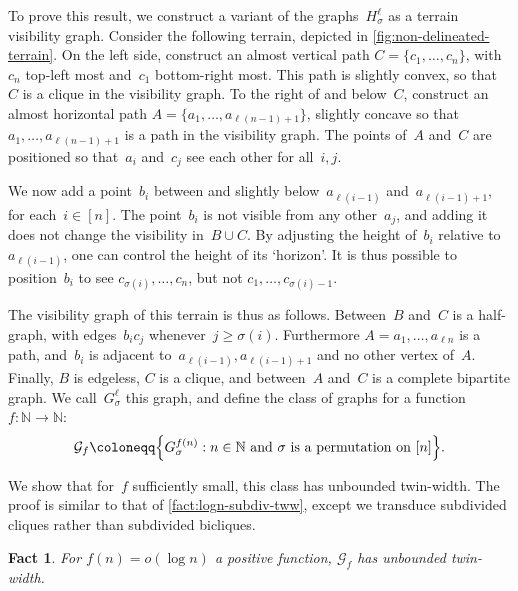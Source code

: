 \documentclass[a4paper,UKenglish,cleveref,thm-restate]{lipics-v2021}
\newtheorem{fact}[theorem]{Fact}
\theoremstyle{remark}
\newcommand{\Gc}{\mathcal{G}}
\newcommand{\N}{\mathbb{N}}
\begin{document}
To prove this result, we construct a variant of the graphs~$H_\sigma^\ell$ as a terrain visibility graph.
Consider the following terrain, depicted in \cref{fig:non-delineated-terrain}.
On the left side, construct an almost vertical path $C = \{c_1,\dots,c_n\}$, with~$c_n$ top-left most and~$c_1$ bottom-right most.
This path is slightly convex, so that~$C$ is a clique in the visibility graph.
To the right of and below~$C$, construct an almost horizontal path $A = \{a_1,\dots,a_{\ell (n-1)+1}\}$,
slightly concave so that $a_1,\dots,a_{\ell (n-1)+1}$ is a path in the visibility graph.
The points of~$A$ and~$C$ are positioned so that~$a_i$ and~$c_j$ see each other for all~$i,j$.

We now add a point~$b_i$ between and slightly below~$a_{\ell (i-1)}$ and~$a_{\ell (i-1) + 1}$, for each~$i \in [n]$.
The point~$b_i$ is not visible from any other~$a_j$, and adding it does not change the visibility in~$B \cup C$.
By adjusting the height of~$b_i$ relative to~$a_{\ell(i-1)}$, one can control the height of its `horizon'.
It is thus possible to position~$b_i$ to see $c_{\sigma(i)},\dots,c_n$, but not $c_1,\dots,c_{\sigma(i)-1}$.

The visibility graph of this terrain is thus as follows.
Between~$B$ and~$C$ is a half-graph, with edges~$b_ic_j$ whenever~$j \ge \sigma(i)$.
Furthermore $A = a_1,\dots,a_{\ell n}$ is a path, and~$b_i$ is adjacent to~$a_{\ell(i-1)},a_{\ell(i-1)+1}$ and no other vertex of~$A$.
Finally, $B$ is edgeless, $C$ is a clique, and between~$A$ and~$C$ is a complete bipartite graph.
We call~$G_\sigma^\ell$ this graph, and define the class of graphs for a function $f: \N \rightarrow \N$:
\[
    \Gc_f \coloneqq \Bigl\{G_\sigma^{f(n)} : n \in \N \text{ and } \sigma \text{ is a permutation on } [n]\Bigr\}.
\]

We show that for~$f$ sufficiently small, this class has unbounded twin-width.
The proof is similar to that of \cref{fact:logn-subdiv-tww}, except we transduce subdivided cliques rather than subdivided bicliques.
\begin{fact} \label{fact:logn-subdiv-tww2}
     For $f(n) = o(\log n)$ a positive function, $\Gc_f$ has unbounded twin-width.
\end{fact}
\end{document}
